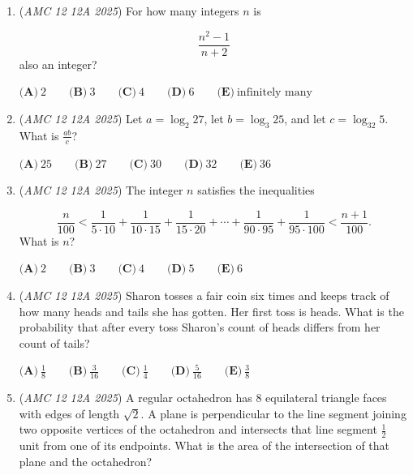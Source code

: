 \begin{enumerate}
	\item (\textit{AMC 12 12A 2025}) For how many integers $n$ is

 \[\frac{n^{2}-1}{n+2}\]
also an integer?


 $\textbf{(A)}\   2  \qquad                 \textbf{(B)}\   3  \qquad                 \textbf{(C)}\   4  \qquad                 \textbf{(D)}\   6  \qquad                 \textbf{(E)}\   \text{infinitely many}$


	\item (\textit{AMC 12 12A 2025}) Let $a = \log_{2}27$, let $b = \log_{3}25$, and let $c = \log_{32}5$. What is $\frac{ab}{c}$?


 $\textbf{(A)}\   25  \qquad                 \textbf{(B)}\   27  \qquad                 \textbf{(C)}\   30  \qquad                 \textbf{(D)}\   32  \qquad                 \textbf{(E)}\   36$


	\item (\textit{AMC 12 12A 2025}) The integer $n$ satisfies the inequalities

 \[\frac{n}{100} < \frac{1}{5 \cdot 10} + \frac{1}{10 \cdot 15} + \frac{1}{15 \cdot 20} + \cdots + \frac{1}{90\cdot 95} + \frac{1}{95\cdot 100} < \frac{n+1}{100}.\]
What is $n$?


 $\textbf{(A)}\   2  \qquad                 \textbf{(B)}\   3  \qquad                 \textbf{(C)}\   4  \qquad                 \textbf{(D)}\   5  \qquad                 \textbf{(E)}\   6$


	\item (\textit{AMC 12 12A 2025}) Sharon tosses a fair coin six times and keeps track of how many heads and tails she has gotten. Her first toss is heads. What is the probability that after every toss Sharon's count of heads differs from her count of tails?


 $\textbf{(A)}\   \frac{1}{8}  \qquad                 \textbf{(B)}\   \frac{3}{16}  \qquad                 \textbf{(C)}\   \frac{1}{4}  \qquad                 \textbf{(D)}\   \frac{5}{16}  \qquad                 \textbf{(E)}\   \frac{3}{8}$


	\item (\textit{AMC 12 12A 2025}) A regular octahedron has $8$ equilateral triangle faces with edges of length $\sqrt{2}$. A plane is perpendicular to the line segment joining two opposite vertices of the octahedron and intersects that line segment $\frac{1}{2}$ unit from one of its endpoints. What is the area of the intersection of that plane and the octahedron?



\end{enumerate}
